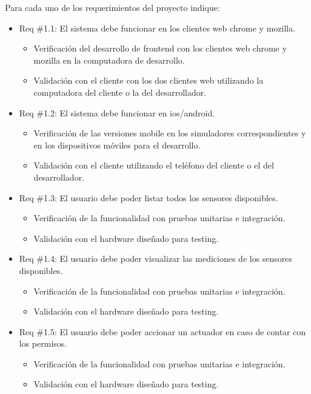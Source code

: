 \documentclass[
11pt, %
]{charter}
\begin{document}
Para cada uno de los requerimientos del proyecto indique:
\begin{itemize} 
\item Req \#1.1: El sistema debe funcionar en los clientes web chrome y mozilla.
\begin{itemize}
	\item Verificación del desarrollo de frontend con los clientes web chrome y mozilla en la computadora de desarrollo. 
	\item Validación con el cliente con los dos clientes web utilizando la computadora del cliente o la del desarrollador.
\end{itemize}

\item Req \#1.2: El sistema debe funcionar en ios/android.
\begin{itemize}
	\item Verificación de las versiones mobile en los simuladores correspondientes y en los dispositivos móviles para el desarrollo. 
	\item Validación con el cliente utilizando el teléfono del cliente o el del desarrollador.
\end{itemize}

\item Req \#1.3: El usuario debe poder listar todos los sensores disponibles.
\begin{itemize}
	\item Verificación de la funcionalidad con pruebas unitarias e integración. 
	\item Validación con el hardware diseñado para testing.
\end{itemize}

\item Req \#1.4: El usuario debe poder visualizar las mediciones de los sensores disponibles.
\begin{itemize}
	\item  Verificación de la funcionalidad con pruebas unitarias e integración.
	\item Validación con el hardware diseñado para testing.
\end{itemize}

\item Req \#1.5: El usuario debe poder accionar un actuador en caso de contar con los permisos.
\begin{itemize}
	\item  Verificación de la funcionalidad con pruebas unitarias e integración.
	\item Validación con el hardware diseñado para testing.
\end{itemize}


\end{itemize}
\end{document}
